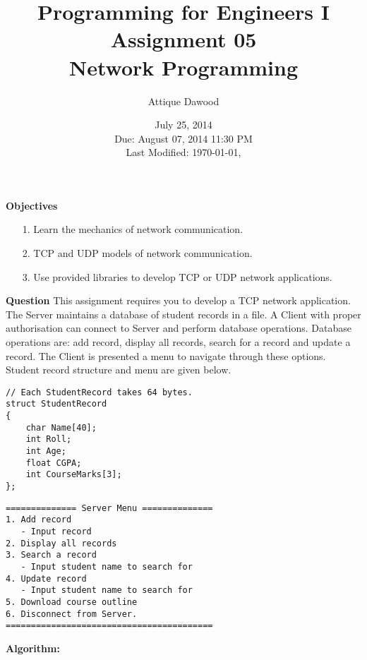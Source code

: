 \documentclass[12pt,a4paper]{article}
\title{Programming for Engineers I\\Assignment 05\\Network Programming}
\author{Attique Dawood}
\date{July 25, 2014\\Due: August 07, 2014 11:30 PM\\[0.2cm] Last Modified: \today, \currenttime}
\begin{document}
\maketitle
\noindent\textbf{Objectives}
\begin{itemize}
\item[1.] Learn the mechanics of network communication.
\item[2.] TCP and UDP models of network communication.
\item[3.] Use provided libraries to develop TCP or UDP network applications.
\end{itemize}
\noindent\textbf{Question} This assignment requires you to develop a TCP network application. The Server maintains a database of student records in a file. A Client with proper authorisation can connect to Server and perform database operations. Database operations are: add record, display all records, search for a record and update a record. The Client is presented a menu to navigate through these options. Student record structure and menu are given below.
\begin{verbatim}
// Each StudentRecord takes 64 bytes.
struct StudentRecord
{
    char Name[40];
    int Roll;
    int Age;
    float CGPA;
    int CourseMarks[3];
};
\end{verbatim}
\begin{verbatim}
============== Server Menu ==============
1. Add record
   - Input record
2. Display all records
3. Search a record
   - Input student name to search for
4. Update record
   - Input student name to search for
5. Download course outline
6. Disconnect from Server.
=========================================
\end{verbatim}
\newpage
\noindent\textbf{Algorithm:}
\end{document}
